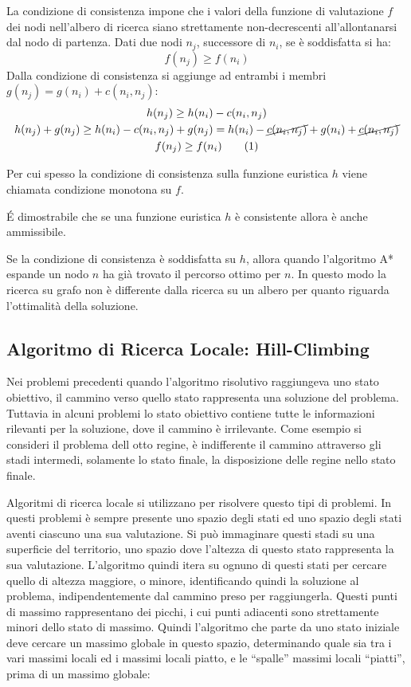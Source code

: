 \documentclass{article}
\numberwithin{equation}{subsection}
\newcommand{\tageq}{\tag{\stepcounter{equation}\theequation}}
\begin{document}
La condizione di consistenza impone che i valori della funzione di valutazione $f$ dei nodi 
nell'albero di ricerca siano strettamente non-decrescenti all'allontanarsi dal nodo di 
partenza. Dati due nodi $n_j$, successore di $n_i$, se è soddisfatta si ha:
\begin{equation*}
    f(n_j)\geq f(n_i)
\end{equation*}
Dalla condizione di consistenza si aggiunge ad entrambi i membri $g(n_j)=g(n_i)+c(n_i,n_j)$:
\begin{gather*}
    h(n_j)\geq h(n_i)-c(n_i,n_j)\\
    h(n_j)+g(n_j)\geq h(n_i)-c(n_i,n_j)+g(n_j)=h(n_i)-\cancel{c(n_i,n_j)}+g(n_i)+\cancel{c(n_i,n_j)}\\
    f(n_j)\geq f(n_i)\tageq
\end{gather*}

Per cui spesso la condizione di consistenza sulla funzione euristica $h$ viene chiamata 
condizione monotona su $f$. 

\'{E} dimostrabile che se una funzione euristica $h$ è consistente allora è anche ammissibile. 

Se la condizione di consistenza è soddisfatta su $h$, allora quando l'algoritmo A* espande un nodo 
$n$ ha già trovato il percorso ottimo per $n$. In questo modo la ricerca su grafo non è 
differente dalla ricerca su un albero per quanto riguarda l'ottimalità della soluzione. 

\subsection{Algoritmo di Ricerca Locale: Hill-Climbing}


Nei problemi precedenti quando l'algoritmo risolutivo raggiungeva uno stato obiettivo, il cammino verso quello stato rappresenta una soluzione 
del problema. Tuttavia in alcuni problemi lo stato obiettivo contiene tutte le informazioni rilevanti per la soluzione, dove il cammino è 
irrilevante. Come esempio si consideri il problema dell otto regine, è indifferente il cammino attraverso gli stadi intermedi, solamente lo 
stato finale, la disposizione delle regine nello stato finale. 

Algoritmi di ricerca locale si utilizzano per risolvere questo tipi di problemi. In questi problemi è sempre presente uno spazio degli stati 
ed uno spazio degli stati aventi ciascuno una sua valutazione. Si può immaginare questi stadi su una superficie del territorio, uno spazio dove l'altezza 
di questo stato rappresenta la sua valutazione. L'algoritmo quindi itera su ognuno di questi stati per cercare quello di altezza maggiore, o minore, identificando 
quindi la soluzione al problema, indipendentemente dal cammino preso per raggiungerla. Questi punti di massimo rappresentano dei picchi, i cui punti adiacenti sono 
strettamente minori dello stato di massimo. Quindi l'algoritmo che parte da uno stato iniziale deve cercare un massimo globale in questo spazio, determinando quale sia 
tra i vari massimi locali ed i massimi locali piatto, e le ``spalle'' massimi locali ``piatti'', prima di un massimo globale:
\end{document}

